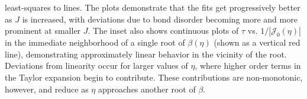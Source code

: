 \documentclass[aps,prl, notitlepage]{revtex4-1}
\begin{document}
least-squares to lines. The plots demonstrate that the fits get progressively better as $J$ is increased, with deviations due to bond disorder becoming more and more prominent at smaller $J$. The inset also shows continuous plots of $\tau$ vs. $1/|\mathcal{J}_0(\eta)|$ in the immediate neighborhood of a single root of $\beta(\eta)$ (shown as a vertical red line), demonstrating approximately linear behavior in the vicinity of the root. Deviations from linearity occur for larger values of $\eta$, where higher order terms in the Taylor expansion begin to contribute. These contributions are non-monotonic, however, and reduce as $\eta$ approaches another root of $\beta$.
\afterpage{\clearpage}


\end{document}
